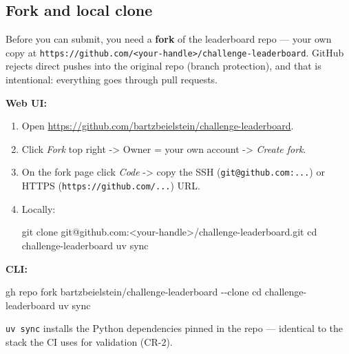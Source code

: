 \documentclass[
  english,
  letterpaper,
]{scrbook}
\newenvironment{Shaded}{\begin{snugshade}}{\end{snugshade}}
\newcommand{\AttributeTok}[1]{\textcolor[rgb]{0.40,0.45,0.13}{#1}}
\newcommand{\BuiltInTok}[1]{\textcolor[rgb]{0.00,0.23,0.31}{#1}}
\newcommand{\ExtensionTok}[1]{\textcolor[rgb]{0.00,0.23,0.31}{#1}}
\newcommand{\FunctionTok}[1]{\textcolor[rgb]{0.28,0.35,0.67}{#1}}
\newcommand{\NormalTok}[1]{\textcolor[rgb]{0.00,0.23,0.31}{#1}}
\newcommand{\OperatorTok}[1]{\textcolor[rgb]{0.37,0.37,0.37}{#1}}
\begin{document}
\subsection{Fork and local clone}\label{fork-and-local-clone}

Before you can submit, you need a \textbf{fork} of the leaderboard repo
--- your own copy at
\texttt{https://github.com/\textless{}your-handle\textgreater{}/challenge-leaderboard}.
GitHub rejects direct pushes into the original repo (branch protection),
and that is intentional: everything goes through pull requests.

\textbf{Web UI:}

\begin{enumerate}
\def\labelenumi{\arabic{enumi}.}
\item
  Open \url{https://github.com/bartzbeielstein/challenge-leaderboard}.
\item
  Click \emph{Fork} top right -\textgreater{} Owner = your own account
  -\textgreater{} \emph{Create fork}.
\item
  On the fork page click \emph{Code} -\textgreater{} copy the SSH
  (\texttt{git@github.com:...}) or HTTPS
  (\texttt{https://github.com/...}) URL.
\item
  Locally:

\begin{Shaded}
\begin{Highlighting}[]
\FunctionTok{git}\NormalTok{ clone git@github.com:}\OperatorTok{\textless{}}\NormalTok{your{-}handle}\OperatorTok{\textgreater{}}\NormalTok{/challenge{-}leaderboard.git}
\BuiltInTok{cd}\NormalTok{ challenge{-}leaderboard}
\ExtensionTok{uv}\NormalTok{ sync}
\end{Highlighting}
\end{Shaded}
\end{enumerate}

\textbf{CLI:}

\begin{Shaded}
\begin{Highlighting}[]
\ExtensionTok{gh}\NormalTok{ repo fork bartzbeielstein/challenge{-}leaderboard }\AttributeTok{{-}{-}clone}
\BuiltInTok{cd}\NormalTok{ challenge{-}leaderboard}
\ExtensionTok{uv}\NormalTok{ sync}
\end{Highlighting}
\end{Shaded}

\texttt{uv\ sync} installs the Python dependencies pinned in the repo
--- identical to the stack the CI uses for validation (CR-2).
\end{document}
